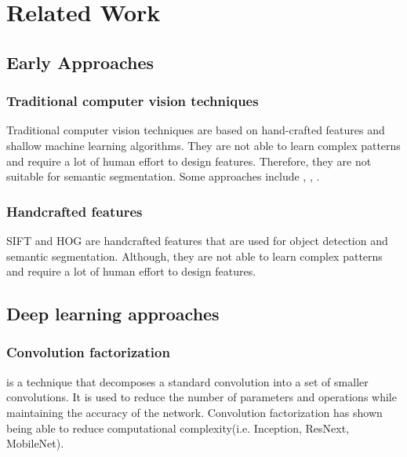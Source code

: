 \section{Related Work}

  \subsection{Early Approaches}

    \subsubsection{Traditional computer vision techniques}

      Traditional computer vision techniques are based on hand-crafted features
      and shallow machine learning algorithms. They are not able to learn complex
      patterns and require a lot of human effort to design features. Therefore,
      they are not suitable for semantic segmentation. Some approaches include
      , , \cite{intelligence2021modern}.

    \subsubsection{Handcrafted features}

      SIFT and HOG are handcrafted features that are used for object detection
      and semantic segmentation. Although, they are not able to learn complex
      patterns and require a lot of human effort to design features\cite{goodfellow2016deep}.

  \subsection{Deep learning approaches}

    \subsubsection{Convolution factorization}

       is a technique that decomposes a standard
      convolution into a set of smaller convolutions. It is used to reduce the
      number of parameters and operations while maintaining the accuracy of the
      network\cite{mehta2018espnet}. Convolution factorization has shown being
      able to reduce computational complexity(i.e. Inception, ResNext, MobileNet).

